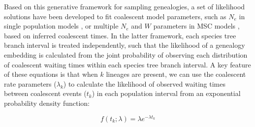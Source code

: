 \documentclass[11pt]{article}
\begin{document}
Based on this generative framework for sampling genealogies, a set of likelihood
solutions have been developed to fit coalescent model parameters, such as 
$N_e$ in single population models \citep{kingman1982coalescent},
or multiple $N_e$ and $W$ parameters in MSC models \citep{rannala2003bayes}, 
based on inferred coalescent times. 
In the latter framework, each species tree branch interval is treated independently, 
such that the likelihood of a genealogy embedding is calculated from the joint
probability of observing each distribution of coalescent waiting times within
each species tree branch interval. A key feature of these equations is that 
when $k$ lineages are present, we can use the coalescent rate parameters 
($\lambda_k$)
to calculate the likelihood of observed waiting times between coalescent 
events ($t_k$) in each population interval from an exponential probability 
density function:
	
\begin{equation}
	f(t_k; \lambda) = \lambda e^{-\lambda t_k}
\end{equation}





\end{document}
